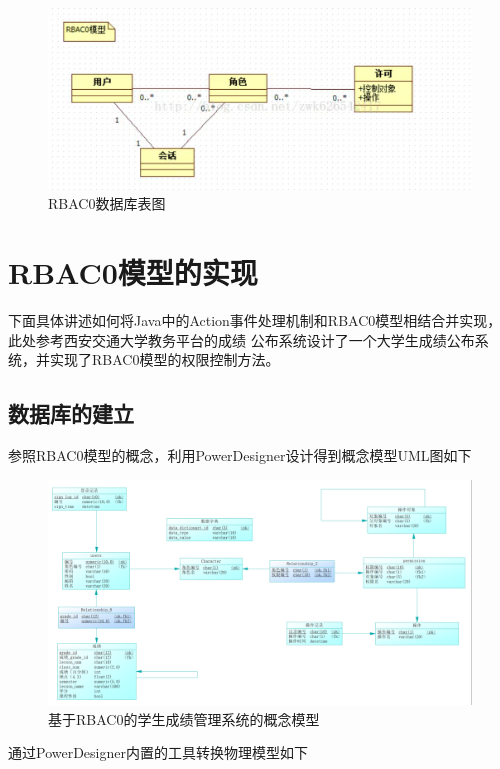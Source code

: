 \documentclass[12pt, a4paper, oneside]{ctexart}
\begin{document}
\begin{figure}[H]
    \centering
    \includegraphics[width = 1\textwidth]{../pic/1/1.1.png}
    \caption{RBAC0数据库表图}
\end{figure}


\section{RBAC0模型的实现}

下面具体讲述如何将Java中的Action事件处理机制和RBAC0模型相结合并实现，此处参考西安交通大学教务平台的成绩
公布系统设计了一个大学生成绩公布系统，并实现了RBAC0模型的权限控制方法。

\subsection{数据库的建立}

参照RBAC0模型的概念，利用PowerDesigner设计得到概念模型UML图如下

\begin{figure}[H]
    \centering
    \includegraphics[width = 1\textwidth]{../pic/2/2.1.png}
    \caption{基于RBAC0的学生成绩管理系统的概念模型}
\end{figure}

通过PowerDesigner内置的工具转换物理模型如下
\end{document}
